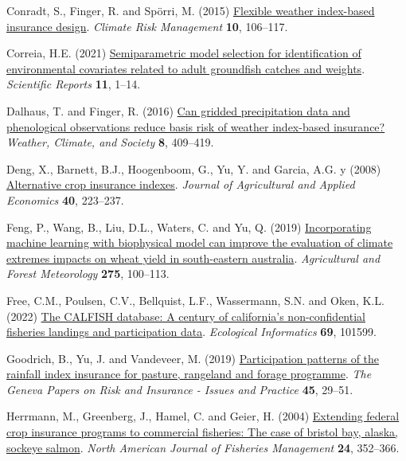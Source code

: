 \documentclass[
  letterpaper,
  DIV=11,
  numbers=noendperiod]{scrartcl}
\newlength{\cslhangindent}
\newlength{\cslentryspacingunit} %
\newenvironment{CSLReferences}[2] %
 {%
  \setlength{\parindent}{0pt}
  \ifodd #1
  \let\oldpar\par
  \def\par{\hangindent=\cslhangindent\oldpar}
  \fi
  \setlength{\parskip}{#2\cslentryspacingunit}
 }%
 {}
\begin{document}
\begin{CSLReferences}{1}{0}
\leavevmode{}%
Conradt, S., Finger, R. and Spörri, M. (2015)
\href{https://doi.org/10.1016/j.crm.2015.06.003}{Flexible weather
index-based insurance design}. \emph{Climate Risk Management}
\textbf{10}, 106--117.

\leavevmode{}%
Correia, H.E. (2021)
\href{https://doi.org/10.1038/s41598-021-89398-8}{Semiparametric model
selection for identification of environmental covariates related to
adult groundfish catches and weights}. \emph{Scientific Reports}
\textbf{11}, 1--14.

\leavevmode{}%
Dalhaus, T. and Finger, R. (2016)
\href{https://doi.org/10.1175/WCAS-D-16-0020.1}{Can gridded
precipitation data and phenological observations reduce basis risk of
weather index-based insurance?} \emph{Weather, Climate, and Society}
\textbf{8}, 409--419.

\leavevmode{}%
Deng, X., Barnett, B.J., Hoogenboom, G., Yu, Y. and Garcia, A.G. y
(2008) \href{https://doi.org/10.1017/s1074070800028078}{Alternative crop
insurance indexes}. \emph{Journal of Agricultural and Applied Economics}
\textbf{40}, 223--237.

\leavevmode{}%
Feng, P., Wang, B., Liu, D.L., Waters, C. and Yu, Q. (2019)
\href{https://doi.org/10.1016/j.agrformet.2019.05.018}{Incorporating
machine learning with biophysical model can improve the evaluation of
climate extremes impacts on wheat yield in south-eastern australia}.
\emph{Agricultural and Forest Meteorology} \textbf{275}, 100--113.

\leavevmode{}%
Free, C.M., Poulsen, C.V., Bellquist, L.F., Wassermann, S.N. and Oken,
K.L. (2022) \href{https://doi.org/10.1016/j.ecoinf.2022.101599}{The
CALFISH database: A century of california's non-confidential fisheries
landings and participation data}. \emph{Ecological Informatics}
\textbf{69}, 101599.

\leavevmode{}%
Goodrich, B., Yu, J. and Vandeveer, M. (2019)
\href{https://doi.org/10.1057/s41288-019-00149-3}{Participation patterns
of the rainfall index insurance for pasture, rangeland and forage
programme}. \emph{The Geneva Papers on Risk and Insurance - Issues and
Practice} \textbf{45}, 29--51.

\leavevmode{}%
Herrmann, M., Greenberg, J., Hamel, C. and Geier, H. (2004)
\href{https://doi.org/10.1577/M02-086.1}{Extending federal crop
insurance programs to commercial fisheries: The case of bristol bay,
alaska, sockeye salmon}. \emph{North American Journal of Fisheries
Management} \textbf{24}, 352--366.


\end{CSLReferences}
\end{document}
